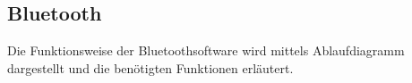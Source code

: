 \subsection{Bluetooth}\label{sec:bluetooth}

Die Funktionsweise der Bluetoothsoftware wird mittels Ablaufdiagramm dargestellt und die benötigten Funktionen erläutert.